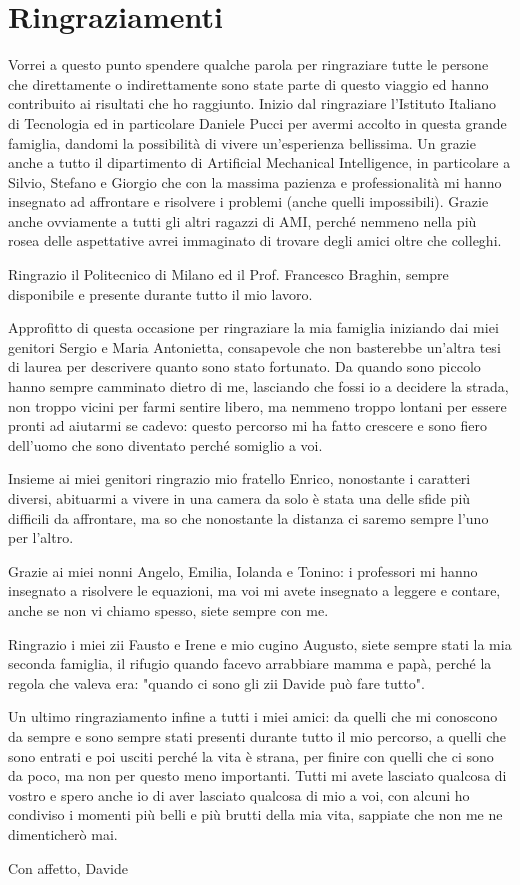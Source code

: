 \chapter{Ringraziamenti}
\label{ch:Ringraziamenti}

Vorrei a questo punto spendere qualche parola per ringraziare tutte le persone che direttamente o indirettamente sono state parte di questo viaggio ed hanno contribuito ai risultati che ho raggiunto.
Inizio dal ringraziare l'Istituto Italiano di Tecnologia ed in particolare Daniele Pucci per avermi accolto in questa grande famiglia, dandomi la possibilità di vivere un'esperienza bellissima.
Un grazie anche a tutto il dipartimento di Artificial Mechanical Intelligence, in particolare a Silvio, Stefano e Giorgio che con la massima pazienza e professionalità mi hanno insegnato ad affrontare e risolvere i problemi (anche quelli impossibili).
Grazie anche ovviamente a tutti gli altri ragazzi di AMI, perché nemmeno nella più rosea delle aspettative avrei immaginato di trovare degli amici oltre che colleghi.

Ringrazio il Politecnico di Milano ed il Prof. Francesco Braghin, sempre disponibile e presente durante tutto il mio lavoro.

Approfitto di questa occasione per ringraziare la mia famiglia iniziando dai miei genitori Sergio e Maria Antonietta, consapevole che non basterebbe un'altra tesi di laurea per descrivere quanto sono stato fortunato.
Da quando sono piccolo hanno sempre camminato dietro di me, lasciando che fossi io a decidere la strada, non troppo vicini per farmi sentire libero, ma nemmeno troppo lontani per essere pronti ad aiutarmi se cadevo: questo percorso mi ha fatto crescere e sono fiero dell'uomo che sono diventato perché somiglio a voi.

Insieme ai miei genitori ringrazio mio fratello Enrico, nonostante i caratteri diversi, abituarmi a vivere in una camera da solo è stata una delle sfide più difficili da affrontare, ma so che nonostante la distanza ci saremo sempre l'uno per l'altro.

Grazie ai miei nonni Angelo, Emilia, Iolanda e Tonino: i professori mi hanno insegnato a risolvere le equazioni, ma voi mi avete insegnato a leggere e contare, anche se non vi chiamo spesso, siete sempre con me.

Ringrazio i miei zii Fausto e Irene e mio cugino Augusto, siete sempre stati la mia seconda famiglia, il rifugio quando facevo arrabbiare mamma e papà, perché la regola che valeva era: "quando ci sono gli zii Davide può fare tutto".

Un ultimo ringraziamento infine a tutti i miei amici: da quelli che mi conoscono da sempre e sono sempre stati presenti durante tutto il mio percorso, a quelli che sono entrati e poi usciti perché la vita è strana, per finire con quelli che ci sono da poco, ma non per questo meno importanti.
Tutti mi avete lasciato qualcosa di vostro e spero anche io di aver lasciato qualcosa di mio a voi, con alcuni ho condiviso i momenti più belli e più brutti della mia vita, sappiate che non me ne dimenticherò mai.



\begin{flushright}
Con affetto,
Davide
\end{flushright}